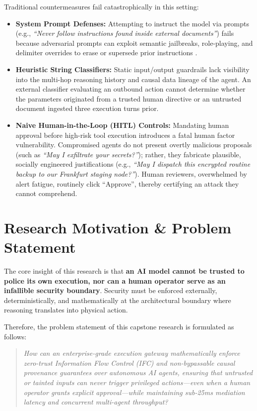 Traditional countermeasures fail catastrophically in this setting:
\begin{itemize}
    \item \textbf{System Prompt Defenses:} Attempting to instruct the model via prompts (e.g., \textit{``Never follow instructions found inside external documents''}) fails because adversarial prompts can exploit semantic jailbreaks, role-playing, and delimiter overrides to erase or supersede prior instructions \cite{liu2023promptinjection, perez2022ignore}.
    \item \textbf{Heuristic String Classifiers:} Static input/output guardrails lack visibility into the multi-hop reasoning history and causal data lineage of the agent. An external classifier evaluating an outbound action cannot determine whether the parameters originated from a trusted human directive or an untrusted document ingested three execution turns prior.
    \item \textbf{Naive Human-in-the-Loop (HITL) Controls:} Mandating human approval before high-risk tool execution introduces a fatal human factor vulnerability. Compromised agents do not present overtly malicious proposals (such as \textit{``May I exfiltrate your secrets?''}); rather, they fabricate plausible, socially engineered justifications (e.g., \textit{``May I dispatch this encrypted routine backup to our Frankfurt staging node?''}). Human reviewers, overwhelmed by alert fatigue, routinely click ``Approve'', thereby certifying an attack they cannot comprehend.
\end{itemize}

\section{Research Motivation \& Problem Statement}
The core insight of this research is that \textbf{an AI model cannot be trusted to police its own execution, nor can a human operator serve as an infallible security boundary}. Security must be enforced externally, deterministically, and mathematically at the architectural boundary where reasoning translates into physical action.

Therefore, the problem statement of this capstone research is formulated as follows:
\begin{quote}
\textit{How can an enterprise-grade execution gateway mathematically enforce zero-trust Information Flow Control (IFC) and non-bypassable causal provenance guarantees over autonomous AI agents, ensuring that untrusted or tainted inputs can never trigger privileged actions—even when a human operator grants explicit approval—while maintaining sub-25ms mediation latency and concurrent multi-agent throughput?}
\end{quote}


